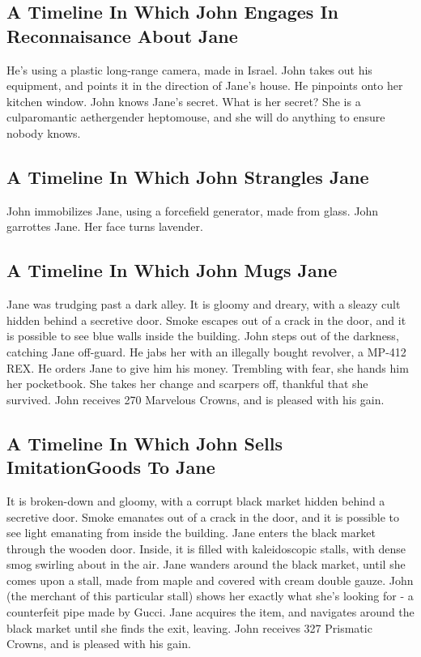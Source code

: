 \documentclass{article}
\begin{document}
\subsection{A Timeline In Which John Engages In Reconnaisance About Jane}


He's using a plastic long{-}range camera, made in Israel.
John takes out his equipment, and points it in the direction of Jane's house. He pinpoints onto her kitchen window.
John knows Jane's secret. What is her secret? She is a culparomantic aethergender heptomouse, and she will do anything to ensure nobody knows.
\subsection{A Timeline In Which John Strangles Jane}


John immobilizes Jane, using a forcefield generator, made from glass.
John garrottes Jane.
Her face turns lavender.
\subsection{A Timeline In Which John Mugs Jane}


Jane was trudging past a dark alley.
It is gloomy and dreary, with a sleazy cult hidden behind a secretive door.
Smoke escapes out of a crack in the door, and it is possible to see blue walls inside the building.
John steps out of the darkness, catching Jane off{-}guard.
He jabs her with an illegally bought revolver, a MP{-}412 REX.
He orders Jane to give him his money.
Trembling with fear, she hands him her pocketbook.
She takes her change and scarpers off, thankful that she survived.
John receives 270 Marvelous Crowns, and is pleased with his gain.
\subsection{A Timeline In Which John Sells ImitationGoods To Jane}


It is broken{-}down and gloomy, with a corrupt black market hidden behind a secretive door.
Smoke emanates out of a crack in the door, and it is possible to see light emanating from inside the building.
Jane enters the black market through the wooden door.
Inside, it is filled with kaleidoscopic stalls, with dense smog swirling about in the air.
Jane wanders around the black market, until she comes upon a stall, made from maple and covered with cream double gauze.
John (the merchant of this particular stall) shows her exactly what she's looking for {-} a counterfeit pipe made by Gucci.
Jane acquires the item, and navigates around the black market until she finds the exit, leaving.
John receives 327 Prismatic Crowns, and is pleased with his gain.
\end{document}
